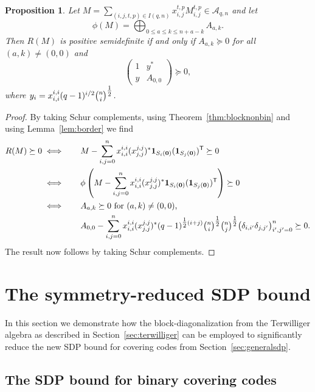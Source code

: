 \documentclass[10pt,a4paper]{article}
\newcommand{\one}{\mathbf{1}}
\newtheorem{proposition}[theorem]{Proposition}
\theoremstyle{definition}
\newcommand{\zero}{\mathbf{0}}
\newcommand{\T}{^{\mathsf{T}}}
\begin{document}
\begin{proposition}\label{prop:RMpsdnonbin}
Let $M=\sum_{(i,j,t,p)\in I(q,n)}x_{i,j}^{t,p}M_{i,j}^{t,p}\in \mathcal{A}_{q,n}$ and let 
\[
\phi(M)=\bigoplus_{0\leq a\leq k\leq n+a-k} A_{a,k}.
\]
Then $R(M)$ is positive semidefinite if and only if $A_{a,k}\succeq 0$ for all $(a,k)\neq (0,0)$ and 
\[
\begin{pmatrix}1&y^*\\y&A_{0,0}\end{pmatrix}\succeq 0,
\]
where $y_i= x_{i,i}^{i,i} (q-1)^{i/2}\tbinom{n}{i}^{\tfrac{1}{2}}$.
\end{proposition}
\begin{proof}
By taking Schur complements, using Theorem~\ref{thm:blocknonbin} and using Lemma~\ref{lem:border} we find 
\begin{alignat*}{3}
R(M)\succeq 0 &\iff&&\quad M-\sum_{i,j=0}^nx_{i,i}^{i,i}(x_{j,j}^{j,j})^*\one_{S_i(\zero)}(\one_{S_j(\zero)})\T\succeq 0\\
&\iff&&\quad \phi\left(M-\sum_{i,j=0}^nx_{i,i}^{i,i}(x_{j,j}^{j,j})^*\one_{S_i(\zero)}(\one_{S_j(\zero)})\T \right)\succeq 0\\
&\iff&&\quad A_{a,k}\succeq 0 \text{ for $(a,k)\neq (0,0)$,}\\
&&&\quad A_{0,0}-\sum_{i,j=0}^nx_{i,i}^{i,i}(x_{j,j}^{j,j})^*(q-1)^{\tfrac{1}{2}(i+j)}\tbinom{n}{i}^{\tfrac{1}{2}}\tbinom{n}{j}^{\tfrac{1}{2}}\big(\delta_{i,i'}\delta_{j,j'}\big)_{i',j'=0}^n\succeq 0.
\end{alignat*}
The result now follows by taking Schur complements.
\end{proof}


\section{The symmetry-reduced SDP bound}
In this section we demonstrate how the block-diagonalization from the Terwilliger algebra as described in Section~\ref{sec:terwilliger} can be employed to significantly reduce the new SDP bound for covering codes from Section~\ref{sec:generalsdp}. 


\subsection{The SDP bound for binary covering codes\label{sec:binary}}
\end{document}

